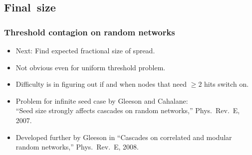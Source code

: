 
\subsection{Final\ size}

\begin{frame}
  \frametitle{Threshold contagion on random networks}

  \begin{block}{}
  \begin{itemize}
  \item<1->
    \alert{Next:} Find expected fractional size of spread.
  \item<2->
    Not obvious even for uniform threshold problem.
  \item<3->
    Difficulty is in figuring out if and when
    nodes that need $\ge 2$ hits switch on.
  \item<4->
    Problem  for infinite seed case by Gleeson and Cahalane:\\
    ``Seed size strongly affects cascades on random networks,'' 
    Phys.\ Rev.\ E, 2007.\cite{gleeson2007a}
  \item<5->
    Developed further by Gleeson
    in ``Cascades on correlated and modular random networks,'' 
    Phys.\ Rev.\ E, 2008.\cite{gleeson2008a}
  \end{itemize}
  \end{block}

\end{frame}

